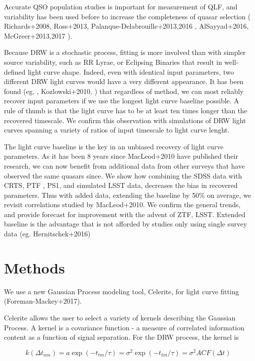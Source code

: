 \documentclass[twocolumn]{aastex62}
\begin{document}
Accurate QSO population studies is important for measurement of QLF, and variability has been used before to increase the completeness of quasar selection  ( Richards+2008, Ross+2013, Palanque-Delabrouille+2013,2016 , AlSayyad+2016, McGreer+2013,2017 ). 


Because DRW is a stochastic process, fitting is more involved than with simpler source variability, such as RR Lyrae, or Eclipsing Binaries that result in well-defined light curve shape.  Indeed,  even with identical input parameters,  two different DRW light curves would have a very different appearance. It has been found (eg. \cite{macleod2011} ,  Kozlowski+2010, \cite{kozlowski2017a}) that regardless of method,  we can most reliably recover input parameters if we use the longest light curve baseline possible. A rule of thumb is that the light curve has to be at least  ten  times longer than the recovered timescale.  We confirm this observation with simulations of DRW light curves spanning a variety of ratios of input timescale to light curve lenght.  

The light curve baseline is the key in an unbiased recovery of light curve parameters. As it has been  8 years since MacLeod+2010 have published their research,   we can now benefit from additional data from other surveys that have observed the same quasars since. We show how combining the SDSS data with CRTS, PTF , PS1,  and simulated LSST data, decreases the bias in recovered parameters.  Thus with added data, extending the baseline by 50\% on average,  we revisit correlations studied by MacLeod+2010.  We confirm the general trends, and provide forecast for improvement with the advent of ZTF, LSST. Extended baseline is the advantage that is not afforded by studies only using single survey data (eg. Hernitschek+2016)



\section{Methods}

We use a new Gaussian Process modeling tool, Celerite, for light curve fitting (Foreman-Mackey+2017).

Celerite allows the user to select a variety of kernels describing the Gaussian Process.  A kernel is a covariance function - a measure of correlated information content as a function of signal separation. For the DRW process, the kernel is  

\begin{equation}
k(\Delta t_{nm}) = a \exp{(-t_{tm} / \tau)} = \sigma^{2}\exp{(-t_{tm} / \tau)}  = \sigma^{2} ACF(\Delta t)
\end{equation} 
\end{document}
